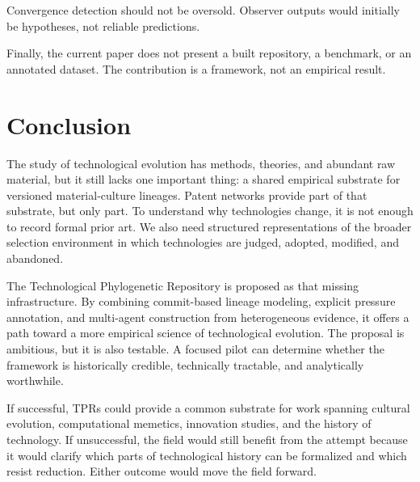 \documentclass[11pt]{article}
\begin{document}
Convergence detection should not be oversold. Observer outputs would initially be hypotheses, not reliable predictions.

Finally, the current paper does not present a built repository, a benchmark, or an annotated dataset. The contribution is a framework, not an empirical result.

\section{Conclusion}
The study of technological evolution has methods, theories, and abundant raw material, but it still lacks one important thing: a shared empirical substrate for versioned material-culture lineages. Patent networks provide part of that substrate, but only part. To understand why technologies change, it is not enough to record formal prior art. We also need structured representations of the broader selection environment in which technologies are judged, adopted, modified, and abandoned.

The Technological Phylogenetic Repository is proposed as that missing infrastructure. By combining commit-based lineage modeling, explicit pressure annotation, and multi-agent construction from heterogeneous evidence, it offers a path toward a more empirical science of technological evolution. The proposal is ambitious, but it is also testable. A focused pilot can determine whether the framework is historically credible, technically tractable, and analytically worthwhile.

If successful, TPRs could provide a common substrate for work spanning cultural evolution, computational memetics, innovation studies, and the history of technology. If unsuccessful, the field would still benefit from the attempt because it would clarify which parts of technological history can be formalized and which resist reduction. Either outcome would move the field forward.
\end{document}

